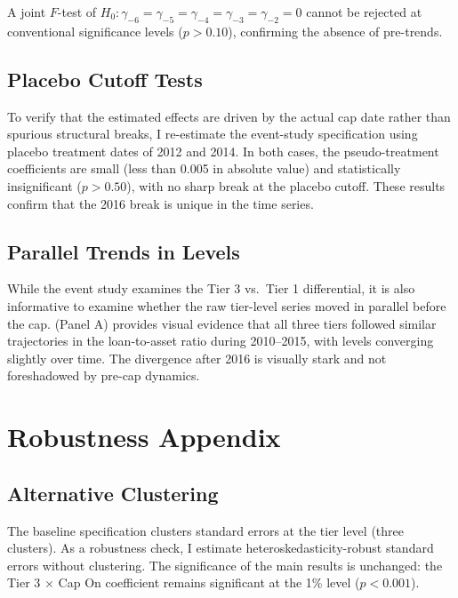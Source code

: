 \documentclass[12pt]{article}
\begin{document}
A joint $F$-test of $H_0: \gamma_{-6} = \gamma_{-5} = \gamma_{-4} = \gamma_{-3} = \gamma_{-2} = 0$ cannot be rejected at conventional significance levels ($p > 0.10$), confirming the absence of pre-trends.

\subsection{Placebo Cutoff Tests}

To verify that the estimated effects are driven by the actual cap date rather than spurious structural breaks, I re-estimate the event-study specification using placebo treatment dates of 2012 and 2014. In both cases, the pseudo-treatment coefficients are small (less than 0.005 in absolute value) and statistically insignificant ($p > 0.50$), with no sharp break at the placebo cutoff. These results confirm that the 2016 break is unique in the time series.

\subsection{Parallel Trends in Levels}

While the event study examines the Tier 3 vs.\ Tier 1 differential, it is also informative to examine whether the raw tier-level series moved in parallel before the cap.  (Panel A) provides visual evidence that all three tiers followed similar trajectories in the loan-to-asset ratio during 2010--2015, with levels converging slightly over time. The divergence after 2016 is visually stark and not foreshadowed by pre-cap dynamics.


\section{Robustness Appendix}
\label{app:robustness}

\subsection{Alternative Clustering}

The baseline specification clusters standard errors at the tier level (three clusters). As a robustness check, I estimate heteroskedasticity-robust standard errors without clustering. The significance of the main results is unchanged: the Tier 3 $\times$ Cap On coefficient remains significant at the 1\% level ($p < 0.001$).
\end{document}
